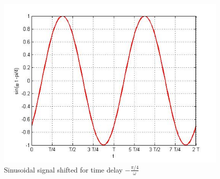 \documentclass{ximera}
\begin{document}
\begin{enumerate}
\begin{enumerate}
\begin{figure}[htbp]
\includegraphics[scale=0.4]{jpg/cpef2.jpg}
\caption{ Sinusoidal signal shifted for time delay $-\frac{\pi/4}{\omega}$}
\label{sinMinus45T}
\end{figure}



\end{enumerate}
\end{enumerate}








\end{document}
